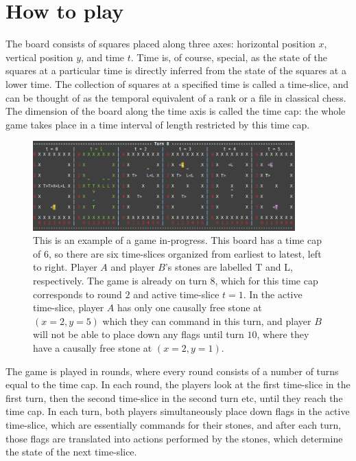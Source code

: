 \documentclass[12pt]{article}
\begin{document}
	\section{How to play}
	The board consists of squares placed along three axes: horizontal position $x$, vertical position $y$, and time $t$. Time is, of course, special, as the state of the squares at a particular time is directly inferred from the state of the squares at a lower time. The collection of squares at a specified time is called a time-slice, and can be thought of as the temporal equivalent of a rank or a file in classical chess. The dimension of the board along the time axis is called the time cap: the whole game takes place in a time interval of length restricted by this time cap.
	
	\begin{figure}[h]
\begin{center}

    \includegraphics[width=0.9\textwidth]{images/diag_game_example}
 \caption{This is an example of a game in-progress. This board has a time cap of $6$, so there are six time-slices organized from earliest to latest, left to right. Player $A$ and player $B$'s stones are labelled T and L, respectively. The game is already on turn $8$, which for this time cap corresponds to round $2$ and active time-slice $t=1$. In the active time-slice, player $A$ has only one causally free stone at $(x=2, y=5)$ which they can command in this turn, and player $B$ will not be able to place down any flags until turn $10$, where they have a causally free stone at $(x=2, y=1)$.}\label{fig:placing flags}
\end{center}
\end{figure}
	
	The game is played in rounds, where every round consists of a number of turns equal to the time cap. In each round, the players look at the first time-slice in the first turn, then the second time-slice in the second turn etc, until they reach the time cap. In each turn, both players simultaneously place down flags in the active time-slice, which are essentially commands for their stones, and after each turn, those flags are translated into actions performed by the stones, which determine the state of the next time-slice.
	
\end{document}
